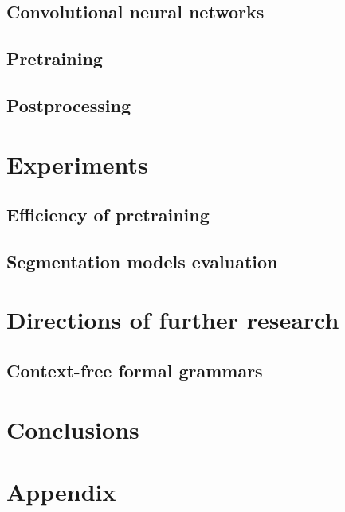 \documentclass[twocolumn, a4paper]{article}
\theoremstyle{definition}
\begin{document}
\subsection{Convolutional neural networks}

\subsection{Pretraining}

\subsection{Postprocessing}

\section{Experiments}

\subsection{Efficiency of pretraining}

\subsection{Segmentation models evaluation}

\section{Directions of further research}
\subsection{Context-free formal grammars}

\section{Conclusions}




\onecolumn
\section*{Appendix}
\end{document}
